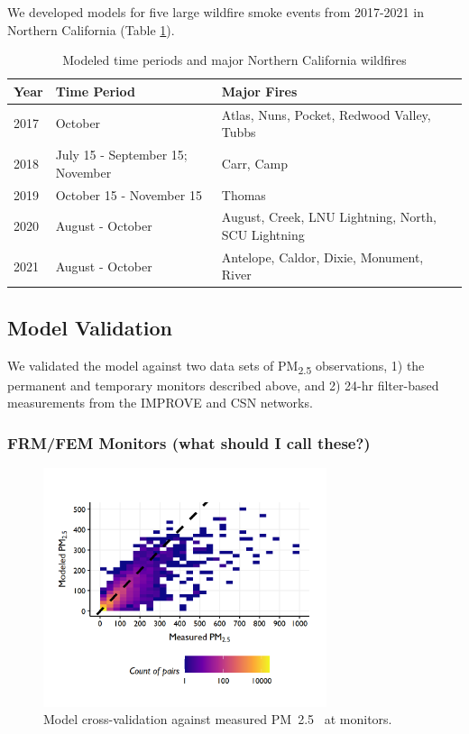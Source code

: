 \documentclass[gmd, manuscript]{copernicus}
\begin{document}
We developed models for five large wildfire smoke events from 2017-2021
in Northern California (Table \ref{table:2}).

\begin{table}[h]
\caption{Modeled time periods and major Northern California wildfires}
\begin{tabular}{lll}
Year & Time Period              & Major Fires                                        \\ \hline
2017 & October                  & Atlas, Nuns, Pocket, Redwood Valley, Tubbs         \\
2018 & July 15 - September 15; November   & Carr, Camp                               \\
2019 & October 15 - November 15 & Thomas                                             \\
2020 & August - October         & August, Creek, LNU Lightning, North, SCU Lightning \\
2021 & August - October         & Antelope, Caldor, Dixie, Monument, River          
\end{tabular}
\label{table:2}
\end{table}

\subsection{Model Validation}

We validated the model against two data sets of PM\textsubscript{2.5}
observations, 1) the permanent and temporary monitors described above,
and 2) 24-hr filter-based measurements from the IMPROVE and CSN
networks.

\subsubsection{FRM/FEM Monitors (what should I call these?)}

\begin{figure}
\includegraphics[width=8.3cm]{./Figures/MultiEventValidationGMD} \caption{Model cross-validation against measured PM~2.5~ at monitors.}\label{fig:unnamed-chunk-1}
\end{figure}
\end{document}
